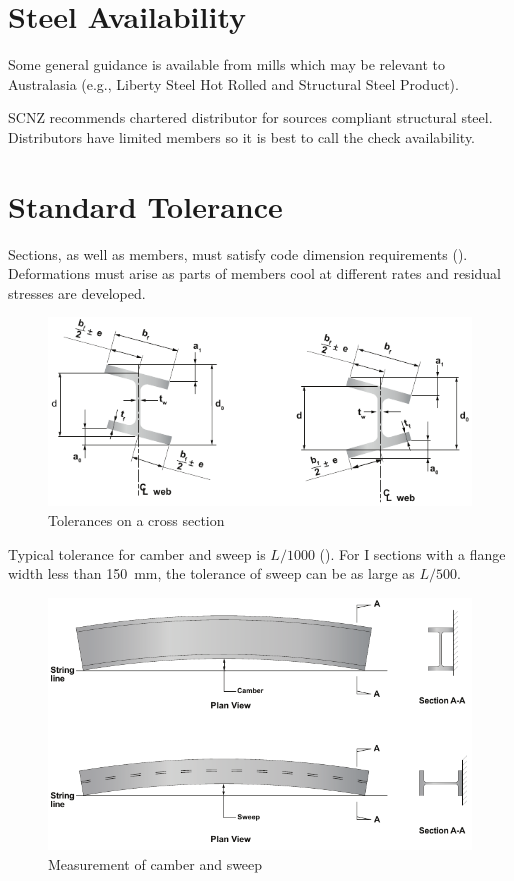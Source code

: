 \section{Steel Availability}
Some general guidance is available from mills which may be relevant to Australasia (e.g., Liberty Steel Hot Rolled and Structural Steel Product).

SCNZ recommends chartered distributor for sources compliant structural steel. Distributors have limited members so it is best to call the check availability.
\section{Standard Tolerance}
Sections, as well as members, must satisfy code dimension requirements (). Deformations must arise as parts of members cool at different rates and residual stresses are developed.
\begin{figure}[H]
\centering
\includegraphics[width=14cm]{PIC/CH02/TOLERANCE}
\caption{Tolerances on a cross section}
\end{figure}

Typical tolerance for camber and sweep is $L/1000$ (). For I sections with a flange width less than \SI{150}{\mm}, the tolerance of sweep can be as large as $L/500$.
\begin{figure}[H]
\centering
\includegraphics[width=14cm]{PIC/CH02/CAMBER}
\caption{Measurement of camber and sweep}
\end{figure}
